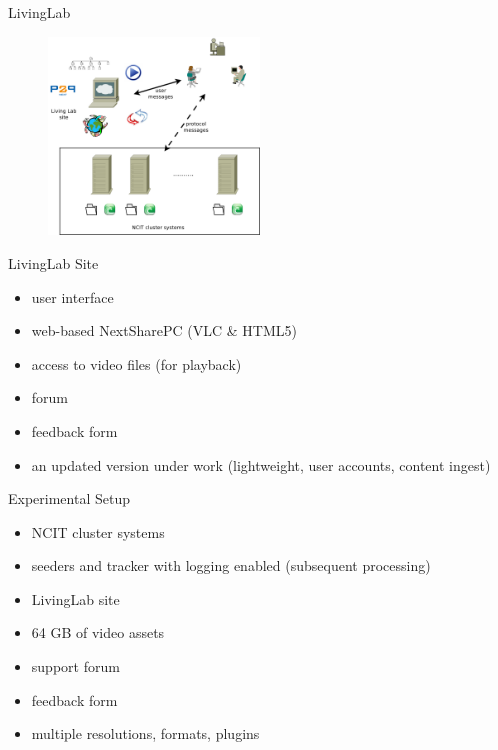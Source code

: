 \documentclass{beamer}
\begin{document}
\begin{frame}{LivingLab}
  \begin{figure}
    \includegraphics[width=0.5\textwidth]{img/upb-living-lab-components}
  \end{figure}
\end{frame}

\begin{frame}{LivingLab Site}
  \begin{itemize}
    \item user interface
    \item web-based NextSharePC (VLC \& HTML5)
    \item access to video files (for playback)
    \item forum
    \item feedback form
    \item an updated version under work (lightweight, user accounts, content
    ingest)
  \end{itemize}
\end{frame}

\begin{frame}{Experimental Setup}
  \begin{itemize}
    \item NCIT cluster systems
    \item seeders and tracker with logging enabled (subsequent processing)
    \item LivingLab site
    \item 64 GB of video assets
    \item support forum
    \item feedback form
    \item multiple resolutions, formats, plugins
  \end{itemize}
\end{frame}
\end{document}
